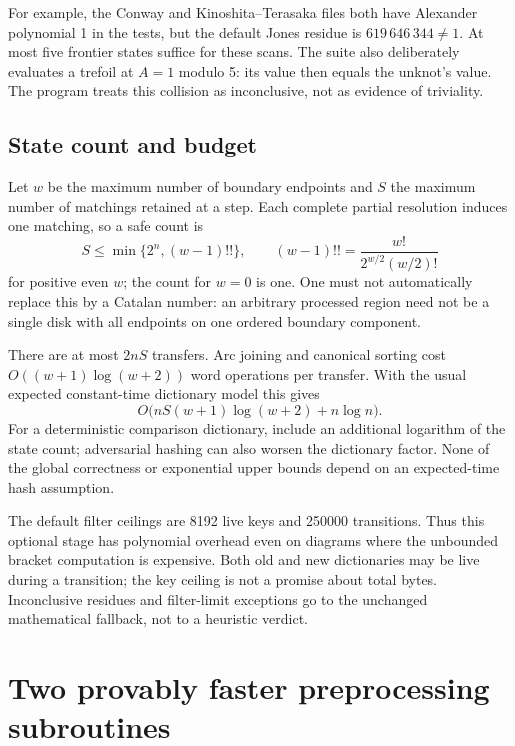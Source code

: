 \documentclass[11pt,letterpaper]{article}
\theoremstyle{definition}
\begin{document}
For example, the Conway and Kinoshita--Terasaka files both have Alexander
polynomial 1 in the tests, but the default Jones residue is
$619\,646\,344\ne1$. At most five frontier states suffice for these scans.
The suite also deliberately evaluates a trefoil at $A=1$ modulo 5: its value
then equals the unknot's value. The program treats this collision as
inconclusive, not as evidence of triviality.

\subsection{State count and budget}

Let $w$ be the maximum number of boundary endpoints and $S$ the maximum number
of matchings retained at a step. Each complete partial resolution induces one
matching, so a safe count is
\begin{equation}\label{eq:states}
 S\leq \min\{2^n,(w-1)!!\},
 \qquad (w-1)!!=\frac{w!}{2^{w/2}(w/2)!}
\end{equation}
for positive even $w$; the count for $w=0$ is one. One must not automatically
replace this by a Catalan number: an arbitrary processed region need not be a
single disk with all endpoints on one ordered boundary component.

There are at most $2nS$ transfers. Arc joining and canonical sorting cost
$O((w+1)\log(w+2))$ word operations per transfer. With the usual expected
constant-time dictionary model this gives
\[
 O\bigl(nS(w+1)\log(w+2)+n\log n\bigr).
\]
For a deterministic comparison dictionary, include an additional logarithm of
the state count; adversarial hashing can also worsen the dictionary factor.
None of the global correctness or exponential upper bounds depend on an
expected-time hash assumption.

The default filter ceilings are 8192 live keys and 250000 transitions. Thus
this optional stage has polynomial overhead even on diagrams where the
unbounded bracket computation is expensive. Both old and new dictionaries may
be live during a transition; the key ceiling is not a promise about total
bytes. Inconclusive residues and filter-limit exceptions go to the unchanged
mathematical fallback, not to a heuristic verdict.

\section[Faster preprocessing]{Two provably faster preprocessing subroutines}
\end{document}
